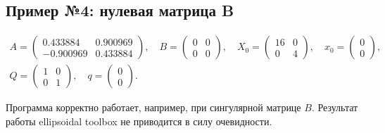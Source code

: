 \documentclass[10pt, a4paper]{article}
\begin{document}
\subsection{Пример №4: нулевая матрица B}
\begin{gather*}
A =
\left(\begin{array}{cc} 0.433884 & 0.900969\\ -0.900969 & 0.433884 \end{array}\right),\quad
B =
\left(\begin{array}{cc} 0 & 0\\ 0 & 0 \end{array}\right),\quad
X_0 =
\left(\begin{array}{cc} 16 & 0\\ 0 & 4 \end{array}\right),\quad
x_0 =
\left(\begin{array}{c} 0\\ 0 \end{array}\right),\\
Q =
\left(\begin{array}{cc} 1 & 0\\ 0 & 1 \end{array}\right),\quad
q =
\left(\begin{array}{c} 0\\ 0 \end{array}\right).
\end{gather*}

Программа корректно работает, например, при сингулярной матрице $B$. Результат работы ellipsoidal toolbox не приводится в силу очевидности.
\end{document}
